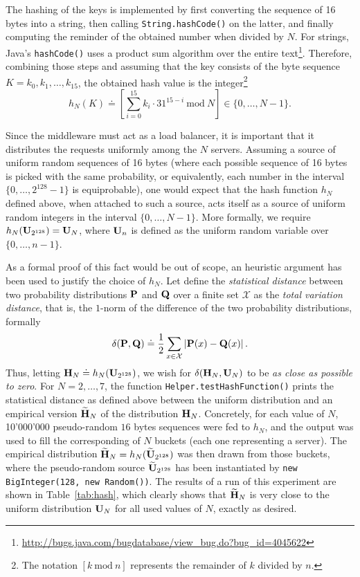 \documentclass[11pt]{article}
\theoremstyle{definition}
\renewcommand\b[1]{{\bf{#1}}}
\renewcommand\t\texttt
\newcommand\md[2]{\left[#1\mathrm{\ mod\ }#2\right]}
\begin{document}
The hashing of the keys is implemented by first converting the sequence of 16 bytes into a string, then calling \t{String.hashCode()} on the latter, and finally computing the reminder of the obtained number when divided by $N$.
For strings, Java's \t{hashCode()} uses a product sum algorithm over the entire text\footnote{\url{http://bugs.java.com/bugdatabase/view_bug.do?bug_id=4045622}}.
Therefore, combining those steps and assuming that the key consists of the byte sequence $K=k_0,k_1,\ldots,k_{15}$, the obtained hash value is the integer\footnote{The notation $\md kn$ represents the remainder of $k$ divided by $n$.}
\[h_N(K)\doteq\md{\sum_{i=0}^{15}k_i\cdot31^{15-i}}N\in\{0,\ldots,N-1\}.\]

Since the middleware must act as a load balancer, it is important that it distributes the requests uniformly among the $N$ servers.
Assuming a source of uniform random sequences of 16 bytes (where each possible sequence of 16 bytes is picked with the same probability, or equivalently, each number in the interval $\{0,\ldots,2^{128}-1\}$ is equiprobable), one would expect that the hash function $h_N$ defined above, when attached to such a source, acts itself as a source of uniform random integers in the interval $\{0,\ldots,N-1\}$.
More formally, we require $h_N(\b U_{2^{128}})=\b U_N$, where $\b U_n$ is defined as the uniform random variable over $\{0,\ldots,n-1\}$.

As a formal proof of this fact would be out of scope, an heuristic argument has been used to justify the choice of $h_N$.
Let define the \emph{statistical distance} between two probability distributions $\b P$ and $\b Q$ over a finite set $\mathcal X$ as the \emph{total variation distance}, that is, the $1$-norm of the difference of the two probability distributions, formally
\[\delta(\b P,\b Q)\doteq\frac12\sum_{x\in\mathcal X}\left\vert\b P(x)-\b Q(x)\right\vert.\]
Thus, letting $\b H_N\doteq h_N(\b U_{2^{128}})$, we wish for $\delta(\b H_N,\b U_N)$ to be \emph{as close as possible to zero}.
For $N=2,\ldots,7$, the function \t{Helper.testHashFunction()} prints the statistical distance as defined above between the uniform distribution and an empirical version $\widetilde\b H_N$ of the distribution $\b H_N$.
Concretely, for each value of $N$, 10'000'000 pseudo-random $16$ bytes sequences were fed to $h_N$, and the output was used to fill the corresponding of $N$ buckets (each one representing a server).
The empirical distribution $\widetilde\b H_N=h_N(\widetilde\b U_{2^{128}})$ was then drawn from those buckets, where the pseudo-random source $\widetilde\b U_{2^{128}}$ has been instantiated by \t{new BigInteger(128, new Random())}.
The results of a run of this experiment are shown in Table~\ref{tab:hash}, which clearly shows that $\widetilde\b H_N$ is very close to the uniform distribution $\b U_N$ for all used values of $N$, exactly as desired.
\end{document}
